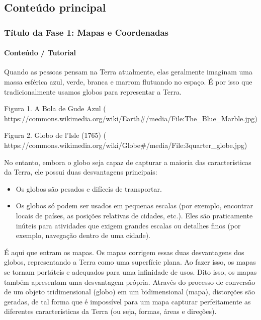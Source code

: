 \documentclass[
]{book}
\providecommand{\tightlist}{%
  \setlength{\itemsep}{0pt}\setlength{\parskip}{0pt}}
\theoremstyle{definition}
\theoremstyle{definition}
\theoremstyle{definition}
\theoremstyle{definition}
\theoremstyle{remark}
\begin{document}
\hypertarget{conteuxfado-principal}{%
\subsection{Conteúdo principal}\label{conteuxfado-principal}}

\hypertarget{tuxedtulo-da-fase-1-mapas-e-coordenadas}{%
\subsubsection{Título da Fase 1: Mapas e Coordenadas}\label{tuxedtulo-da-fase-1-mapas-e-coordenadas}}

\hypertarget{conteuxfado-tutorial}{%
\paragraph{Conteúdo / Tutorial}\label{conteuxfado-tutorial}}

Quando as pessoas pensam na Terra atualmente, elas geralmente imaginam uma massa esférica azul, verde, branca e marrom flutuando no espaço. É por isso que tradicionalmente usamos globos para representar a Terra.

Figura 1. A Bola de Gude Azul ( https://commons.wikimedia.org/wiki/Earth\#/media/File:The\_Blue\_Marble.jpg)

Figura 2. Globo de l'Isle (1765) ( https://commons.wikimedia.org/wiki/Globe\#/media/File:3quarter\_globe.jpg)

No entanto, embora o globo seja capaz de capturar a maioria das características da Terra, ele possui duas desvantagens principais:

\begin{itemize}
\tightlist
\item
  Os globos são pesados e difíceis de transportar.
\item
  Os globos só podem ser usados em pequenas escalas (por exemplo, encontrar locais de países, as posições relativas de cidades, etc.). Eles são praticamente inúteis para atividades que exigem grandes escalas ou detalhes finos (por exemplo, navegação dentro de uma cidade).
\end{itemize}

É aqui que entram os mapas. Os mapas corrigem essas duas desvantagens dos globos, representando a Terra como uma superfície plana. Ao fazer isso, os mapas se tornam portáteis e adequados para uma infinidade de usos. Dito isso, os mapas também apresentam uma desvantagem própria. Através do processo de conversão de um objeto tridimensional (globo) em um bidimensional (mapa), distorções são geradas, de tal forma que é impossível para um mapa capturar perfeitamente as diferentes características da Terra (ou seja, formas, áreas e direções).
\end{document}
